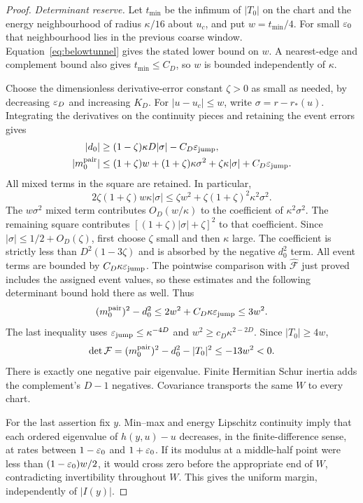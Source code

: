 \begin{proof}
\emph{Determinant reserve.}
Let $t_{\min}$ be the infimum of $|T_0|$ on the chart and the energy neighbourhood of radius $\kappa/16$ about $u_c$, and put $w=t_{\min}/4$. For small $\varepsilon_0$ that neighbourhood lies in the previous coarse window. Equation~\eqref{eq:belowtunnel} gives the stated lower bound on $w$. A nearest-edge and complement bound also gives $t_{\min}\le C_D$, so $w$ is bounded independently of $\kappa$.

Choose the dimensionless derivative-error constant $\zeta>0$ as small as needed, by decreasing $\varepsilon_D$ and increasing $K_D$. For $|u-u_c|\le w$, write $\sigma=r-r_*(u)$. Integrating the derivatives on the continuity pieces and retaining the event errors gives
\[
\begin{split}
 |d_0|&\ge(1-\zeta)\kappa D|\sigma|-C_D\varepsilon_{\rm jump},\\
 |m_0^{\rm pair}|&\le(1+\zeta)w+(1+\zeta)\kappa\sigma^2
                    +\zeta\kappa|\sigma|+C_D\varepsilon_{\rm jump}.
\end{split}
\]
All mixed terms in the square are retained. In particular,
\[
 2\zeta(1+\zeta)w\kappa|\sigma|
 \le\zeta w^2+\zeta(1+\zeta)^2\kappa^2\sigma^2.
\]
The $w\sigma^2$ mixed term contributes $O_D(w/\kappa)$ to the coefficient of $\kappa^2\sigma^2$. The remaining square contributes
$[(1+\zeta)|\sigma|+\zeta]^2$ to that coefficient.
Since $|\sigma|\le1/2+O_D(\zeta)$, first choose $\zeta$ small and then $\kappa$ large. The coefficient is strictly less than $D^2(1-3\zeta)$ and is absorbed by the negative $d_0^2$ term. All event terms are bounded by $C_D\kappa\varepsilon_{\rm jump}$. The pointwise comparison with $\widehat{\mathcal F}$ just proved includes the assigned event values, so these estimates and the following determinant bound hold there as well. Thus
\[
 (m_0^{\rm pair})^2-d_0^2
 \le2w^2+C_D\kappa\varepsilon_{\rm jump}\le3w^2.
\]
The last inequality uses $\varepsilon_{\rm jump}\le\kappa^{-4D}$ and
$w^2\ge c_D\kappa^{2-2D}$. Since $|T_0|\ge4w$,
\[
 \det\mathcal F=(m_0^{\rm pair})^2-d_0^2-|T_0|^2
                    \le-13w^2<0.
\]
There is exactly one negative pair eigenvalue. Finite Hermitian Schur inertia adds the complement's $D-1$ negatives. Covariance transports the same $W$ to every chart.

For the last assertion fix $y$. Min--max and energy Lipschitz continuity imply that each ordered eigenvalue of $h(y,u)-u$ decreases, in the finite-difference sense, at rates between $1-\varepsilon_0$ and $1+\varepsilon_0$. If its modulus at a middle-half point were less than $(1-\varepsilon_0)w/2$, it would cross zero before the appropriate end of $W$, contradicting invertibility throughout $W$. This gives the uniform margin, independently of $|I(y)|$.
\end{proof}
\label{end:below-model}
